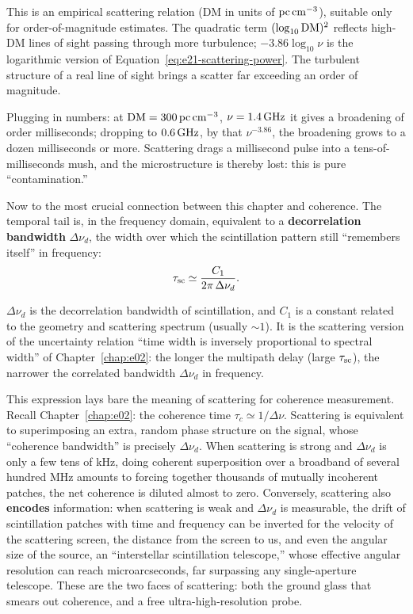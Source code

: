 \begin{formulaexplain}
This is an empirical scattering relation (DM in units of \({\rm pc\,cm^{-3}}\)), suitable only for order-of-magnitude estimates. The quadratic term \((\log_{10}{\rm DM})^2\) reflects high-DM lines of sight passing through more turbulence; \(-3.86\log_{10}\nu\) is the logarithmic version of Equation~\eqref{eq:e21-scattering-power}. The turbulent structure of a real line of sight brings a scatter far exceeding an order of magnitude.
\end{formulaexplain}
Plugging in numbers: at \({\rm DM}=300\,{\rm pc\,cm^{-3}}\), \(\nu=1.4\,{\rm GHz}\) it gives a broadening of order milliseconds; dropping to \(0.6\,{\rm GHz}\), by that \(\nu^{-3.86}\), the broadening grows to a dozen milliseconds or more. Scattering drags a millisecond pulse into a tens-of-milliseconds mush, and the microstructure is thereby lost: this is pure ``contamination.''

Now to the most crucial connection between this chapter and coherence. The temporal tail is, in the frequency domain, equivalent to a \textbf{decorrelation bandwidth} \(\Delta\nu_d\), the width over which the scintillation pattern still ``remembers itself'' in frequency:
\begin{equation}
  \tau_{\rm sc}\simeq \frac{C_1}{2\pi\,\Delta\nu_d}.
  \label{eq:e21-decorrelation-bandwidth}
\end{equation}
\begin{formulaexplain}
\(\Delta\nu_d\) is the decorrelation bandwidth of scintillation, and \(C_1\) is a constant related to the geometry and scattering spectrum (usually \(\sim1\)). It is the scattering version of the uncertainty relation ``time width is inversely proportional to spectral width'' of Chapter~\ref{chap:e02}: the longer the multipath delay (large \(\tau_{\rm sc}\)), the narrower the correlated bandwidth \(\Delta\nu_d\) in frequency.
\end{formulaexplain}
This expression lays bare the meaning of scattering for coherence measurement. Recall Chapter~\ref{chap:e02}: the coherence time \(\tau_c\simeq1/\Delta\nu\). Scattering is equivalent to superimposing an extra, random phase structure on the signal, whose ``coherence bandwidth'' is precisely \(\Delta\nu_d\). When scattering is strong and \(\Delta\nu_d\) is only a few tens of kHz, doing coherent superposition over a broadband of several hundred MHz amounts to forcing together thousands of mutually incoherent patches, the net coherence is diluted almost to zero. Conversely, scattering also \textbf{encodes} information: when scattering is weak and \(\Delta\nu_d\) is measurable, the drift of scintillation patches with time and frequency can be inverted for the velocity of the scattering screen, the distance from the screen to us, and even the angular size of the source, an ``interstellar scintillation telescope,'' whose effective angular resolution can reach microarcseconds, far surpassing any single-aperture telescope. These are the two faces of scattering: both the ground glass that smears out coherence, and a free ultra-high-resolution probe.

